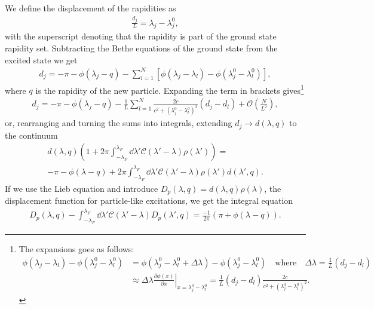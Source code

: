 \documentclass[11pt, a4paper]{report} %
\begin{document}
We define the displacement of the rapidities as~\cite{Caux2015}
\begin{align}
  \label{eq:24}
  \frac{d_j}{L} = \lambda_j - \lambda_j^0,
\end{align}
with the superscript denoting that the rapidity is part of the ground state rapidity set.
Subtracting the Bethe equations of the ground state from the excited state we get~\cite{Franchini2017,Caux2015}
\begin{align}
  \label{eq:25}
   d_j = - \pi - \phi(\lambda_j-q) - \sum_{l=1}^{N} \left[\phi(\lambda_j - \lambda_l) - \phi(\lambda_j^0-\lambda_l^0)\right],
\end{align}
where \(q\) is the rapidity of the new particle.
Expanding the term in brackets gives\footnote{The expansions goes as follows:
  \begin{align*}
    \phi(\lambda_j-\lambda_l) - \phi(\lambda_j^0 - \lambda_l^0) &= \phi(\lambda_j^0 - \lambda_l^0 + \Delta\lambda) - \phi(\lambda_j^0 - \lambda_l^0) \quad \mathrm{where}\quad \Delta \lambda = \frac{1}{L}(d_j - d_l)\\
    &\approx\Delta \lambda \left.\frac{\partial\phi(x)}{\partial x} \right|_{x = \lambda_j^0-\lambda_l^0}
    = \frac{1}{L}(d_j-d_l) \frac{2c}{c^2 + (\lambda_j^0-\lambda_l^0)^2}.
  \end{align*}
}
\begin{align}
  \label{eq:27}
  d_j = -\pi - \phi(\lambda_j-q) - \frac{1}{L} \sum_{l=1}^N \frac{2c}{c^2 + (\lambda_j^0-\lambda_l^0)^2} (d_j-d_l) + \mathcal{O}\left(\frac{N}{L^2}\right),
\end{align}
or, rearranging and turning the sums into integrals, extending \(d_j\to d(\lambda,q)\) to the continuum
\begin{multline}
  \label{eq:28}
  d(\lambda,q) \left(1+2\pi \int_{-\lambda_F}^{\lambda_F} \dd \lambda'\mathcal{C}(\lambda'-\lambda)\rho(\lambda')\right) = \\-\pi -\phi(\lambda-q) + 2\pi \int_{-\lambda_F}^{\lambda_F} \dd \lambda' \mathcal{C}(\lambda'-\lambda) \rho(\lambda') d(\lambda',q).
\end{multline}
If we use the Lieb equation and introduce \(D_p(\lambda,q)=d(\lambda,q)\rho(\lambda)\), the displacement function for particle-like excitations, we get the integral equation~\cite{Caux2015,Franchini2017}
\begin{align}
  \label{eq:partdisplacement}
  D_p(\lambda,q) - \int_{-\lambda_F}^{\lambda_F} \dd \lambda' \mathcal{C}(\lambda'-\lambda) D_p(\lambda', q) = \frac{-1}{2\pi} (\pi+\phi(\lambda-q)).
\end{align}
\end{document}
